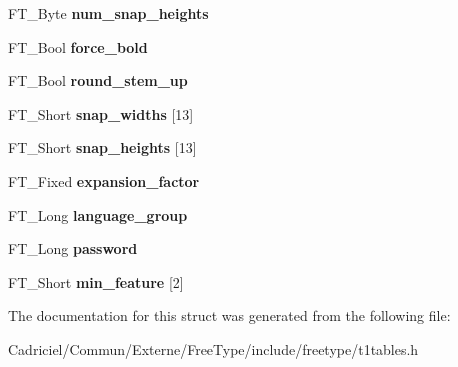 \begin{DoxyCompactItemize}
\item 
F\+T\+\_\+\+Byte {\bfseries num\+\_\+snap\+\_\+heights}\hypertarget{struct_p_s___private_rec___a53f7cfd204400a00eb7203b67d6a1b1c}{}\label{struct_p_s___private_rec___a53f7cfd204400a00eb7203b67d6a1b1c}

\item 
F\+T\+\_\+\+Bool {\bfseries force\+\_\+bold}\hypertarget{struct_p_s___private_rec___a40e62a278e48f47a0f204bd9fa5c883f}{}\label{struct_p_s___private_rec___a40e62a278e48f47a0f204bd9fa5c883f}

\item 
F\+T\+\_\+\+Bool {\bfseries round\+\_\+stem\+\_\+up}\hypertarget{struct_p_s___private_rec___a96b9729811d02146a87ffdc5c254bbe9}{}\label{struct_p_s___private_rec___a96b9729811d02146a87ffdc5c254bbe9}

\item 
F\+T\+\_\+\+Short {\bfseries snap\+\_\+widths} \mbox{[}13\mbox{]}\hypertarget{struct_p_s___private_rec___a39cf1a4b21280bf8082ccba0f4824a8a}{}\label{struct_p_s___private_rec___a39cf1a4b21280bf8082ccba0f4824a8a}

\item 
F\+T\+\_\+\+Short {\bfseries snap\+\_\+heights} \mbox{[}13\mbox{]}\hypertarget{struct_p_s___private_rec___a3583caf0cc05de2afac098574ed0bc4b}{}\label{struct_p_s___private_rec___a3583caf0cc05de2afac098574ed0bc4b}

\item 
F\+T\+\_\+\+Fixed {\bfseries expansion\+\_\+factor}\hypertarget{struct_p_s___private_rec___a45cf6e07c4c26f029e66998e6cad9fa0}{}\label{struct_p_s___private_rec___a45cf6e07c4c26f029e66998e6cad9fa0}

\item 
F\+T\+\_\+\+Long {\bfseries language\+\_\+group}\hypertarget{struct_p_s___private_rec___afc2a7f950a174577ebfc062bb1598f5c}{}\label{struct_p_s___private_rec___afc2a7f950a174577ebfc062bb1598f5c}

\item 
F\+T\+\_\+\+Long {\bfseries password}\hypertarget{struct_p_s___private_rec___a309a871cdeb6f658d8fbff23fa13b667}{}\label{struct_p_s___private_rec___a309a871cdeb6f658d8fbff23fa13b667}

\item 
F\+T\+\_\+\+Short {\bfseries min\+\_\+feature} \mbox{[}2\mbox{]}\hypertarget{struct_p_s___private_rec___af8c829e03c424b1f12b2c9cd4041a868}{}\label{struct_p_s___private_rec___af8c829e03c424b1f12b2c9cd4041a868}

\end{DoxyCompactItemize}


The documentation for this struct was generated from the following file\+:\begin{DoxyCompactItemize}
\item 
Cadriciel/\+Commun/\+Externe/\+Free\+Type/include/freetype/t1tables.\+h\end{DoxyCompactItemize}
